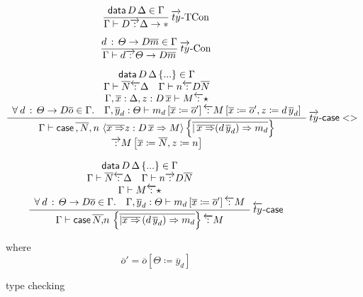 \begin{figure}
\[
\frac{\mathsf{data}\,D\,\Delta\in\Gamma}{\Gamma\vdash D\overrightarrow{\,:\,}\Delta\rightarrow*}\operatorname{\overrightarrow{ty}-TCon}
\]

\[
\frac{d\,:\,\varTheta\rightarrow D\overline{m}\in\Gamma}{\Gamma\vdash d\overrightarrow{\,:\,}\varTheta\rightarrow D\overline{m}}\operatorname{\overrightarrow{ty}-Con}
\]

\[
\frac{\begin{array}{c}
\mathsf{data}\,D\,\Delta\left\{ ...\right\} \in\Gamma\\
\Gamma\vdash\overline{N}\overleftarrow{\,:\,}\Delta\quad\Gamma\vdash n\overleftarrow{\,:\,}D\overline{N}\\
\Gamma,\overline{x}:\Delta,z:D\,\overline{x}\vdash M\overleftarrow{\,:\,}\star\\
\forall\:d\,:\,\varTheta\rightarrow D\overline{o}\in\Gamma.\quad\Gamma,\overline{y}_{d}:\varTheta\vdash m_{d}\left[\overline{x}\coloneqq\overline{o}'\right]\overleftarrow{\,:\,}M\left[\overline{x}\coloneqq\overline{o}',z\coloneqq d\,\overline{y}_{d}\right]
\end{array}}{\begin{array}{c}
\Gamma\vdash \mathsf{case}{} \,\overline{,N},n\,\left\langle \overline{x\Rightarrow}z:D\,\overline{x}\Rightarrow M\right\rangle \left\{ \overline{|\,\overline{x\Rightarrow}(d\,\overline{y}_{d})\Rightarrow m_{d}}\right\} \\
\overrightarrow{\,:\,}M\left[\overline{x}\coloneqq\overline{N},z\coloneqq n\right]
\end{array}
}\operatorname{\overrightarrow{ty}-\mathsf{case}{}<>}
\]

\[
\frac{\begin{array}{c}
\mathsf{data}\,D\,\Delta\left\{ ...\right\} \in\Gamma\\
\Gamma\vdash\overline{N}\overleftarrow{\,:\,}\Delta\quad\Gamma\vdash n\overrightarrow{\,:\,}D\overline{N}\\
\Gamma\vdash M\overleftarrow{\,:\,}\star\\
\forall\:d\,:\,\varTheta\rightarrow D\overline{o}\in\Gamma.\quad\Gamma,\overline{y}_{d}:\varTheta\vdash m_{d}\left[\overline{x}\coloneqq\overline{o}'\right]\overleftarrow{\,:\,}M
\end{array}}{
  \Gamma\vdash \mathsf{case}{} \,\overline{N,}n\,\left\{ \overline{|\overline{x\Rightarrow}\,(d\,\overline{y}_{d})\Rightarrow m_{d}}\right\} \overleftarrow{\,:\,}M
}\operatorname{\overleftarrow{ty}-\mathsf{case}{}}
\]

where 
\[
\overline{o}'= \overline{o}\left[\varTheta \coloneqq \overline{y}_{d} \right]
\]
\caption{\SLang{} \Bidir{} type checking }
\label{fig:surface-data-bi-ty}
\end{figure}

